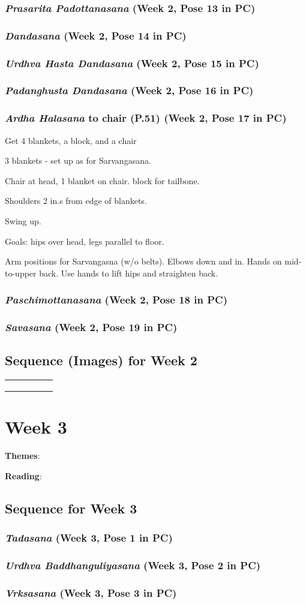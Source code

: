 \documentclass{book}
\newcommand{\apose}[1]{\emph{#1}}
\newcommand{\ardhal}{\apose{Ardha Halasana}}
\newcommand{\dand}{\apose{Dandasana}}
\newcommand{\padadand}{\apose{Padanghusta Dandasana}}
\newcommand{\paschi}{\apose{Paschimottanasana}}
\newcommand{\praspad}{\apose{Prasarita Padottanasana}}
\newcommand{\sav}{\apose{Savasana}}
\newcommand{\tad}{\apose{Tadasana}}
\newcommand{\urdbad}{\apose{Urdhva Baddhanguliyasana}}
\newcommand{\urdhastdand}{\apose{Urdhva Hasta Dandasana}}
\newcommand{\vrk}{\apose{Vrksasana}}
\newcommand{\poseFig}[1]{
  \begin{minipage}{1.0in}
    \texttt{[image: Figures/\{"\#1"]}.jpg}
    \captionof{figure}{{#1}}
    \label{fig:\theweek.#1}
    \vspace{1ex}
  \end{minipage}
}
\newcommand{\dandFig}{\poseFig{Dandasana}}
\newcommand{\namFig}{\poseFig{Namaskarasana}}
\newcommand{\padadandFig}{\poseFig{Padanghusta Dandasana}}
\newcommand{\parshastpadFig}{\poseFig{Parsva Hasta Padasana}}
\newcommand{\parsvoFig}{\poseFig{Parsvottanasana}}
\newcommand{\paschiFig}{\poseFig{Paschimottanasana}}
\newcommand{\praspadFig}{\poseFig{Prasarita Padottanasana}}
\newcommand{\savFig}{\poseFig{Savasana}}
\newcommand{\tadFig}{\poseFig{Tadasana}}
\newcommand{\urdbadFig}{\poseFig{Urdhva Baddhanguliyasana}}
\newcommand{\urdhastFig}{\poseFig{Urdhva Hastasana}}
\newcommand{\urdhastdandFig}{\poseFig{Urdhva Hasta Dandasana}}
\newcommand{\urdnamFig}{\poseFig{Urdhva Namaskarasana}}
\newcommand{\utthastpadFig}{\poseFig{Utthita Hasta Padasana}}
\newcommand{\uttparsvaFig}{\poseFig{Utthita Parsvakonasana}}
\newcommand{\utttrikFig}{\poseFig{Utthita Trikonasana}}
\newcommand{\viraiiFig}{\poseFig{Virabhadrasana II}}
\newcommand{\PC}[2]{{\normalfont\normalsize \hfill(Week #1, Pose #2 in PC)}}
\newcommand{\newpose}[1]{{{#1}}}
\newcounter{week}
\newcounter{pose}
\newcommand{\week}[1]
{ \IfDecimal{#1}{\setcounter{week}{\integerpart}}{fooey}
  \setcounter{pose}{1}
  \chapter{Week {#1}}}
\newcommand{\pose}{\subsection}
\begin{document}
\pose{\praspad{} \PC{2}{13}}

\pose{\dand{} \PC{2}{14}}

\pose{\urdhastdand{} \PC{2}{15}}

\pose{\padadand{} \PC{2}{16}}

\pose{\newpose{\ardhal{}} to chair (P.51) \PC{2}{17}}

Get 4 blankets, a block, and a chair

3 blankets - set up as for Sarvangasana.

Chair at head, 1 blanket on chair. block for tailbone.

Shoulders 2 in.s from edge of blankets.

Swing up.

Goals: hips over head, legs parallel to floor.

Arm positions for Sarvangasna (w/o belts). Elbows down and
in. Hands on mid-to-upper back. Use hands to lift hips and
straighten back.

\pose{\paschi{} \PC{2}{18}}

\pose{\sav{} \PC{2}{19}}
  
\section{Sequence (Images) for Week 2}
\label{seqimags:2}

\begin{tabular}{|c|c|c|c|c|}
\tadFig &
\urdhastFig &
\urdbadFig &
\namFig{} &
\urdnamFig{} \\ \hline
\utthastpadFig{} &
\parshastpadFig{} &
\utttrikFig{} &
\viraiiFig{} &
\uttparsvaFig{} \\ \hline
\parsvoFig{} &
\parsvoFig{} &
\praspadFig{} &
\dandFig{} &
\urdhastdandFig{} \\ \hline
\padadandFig{} &
\paschiFig{} &
\savFig{}
\end{tabular}

\week{3}
\label{week:3}

\textbf{Themes}: 

\textbf{Reading}: 

\section{Sequence for Week 3}
\label{seq:3}

\pose{\tad{} \PC{3}{1}}

\pose{\urdbad{} \PC{3}{2}}

\pose{\newpose{\vrk{}} \PC{3}{3}}
\end{document}
